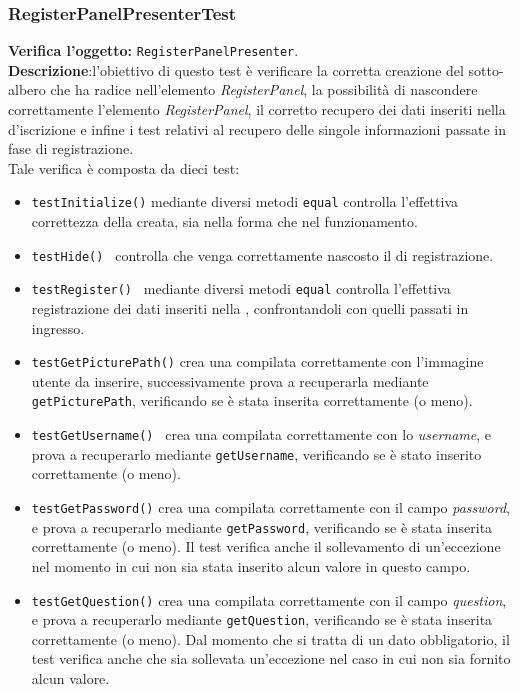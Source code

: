 \subsubsection{RegisterPanelPresenterTest}
\textbf{Verifica l'oggetto:} \texttt{RegisterPanelPresenter}.\\
\textbf{Descrizione}:l'obiettivo di questo test è verificare la corretta creazione del sotto-albero che ha radice nell'elemento \textit{RegisterPanel}, la possibilità di nascondere correttamente l'elemento \textit{RegisterPanel}, il corretto recupero dei dati inseriti nella  d'iscrizione e infine i test relativi al recupero delle singole informazioni passate in fase di registrazione.\\
Tale verifica è composta da dieci test:
\begin{itemize}
\item \texttt{testInitialize()} mediante diversi metodi \texttt{equal} controlla l'effettiva correttezza della  creata, sia nella forma che nel funzionamento.
\item \texttt{testHide() } controlla che venga correttamente nascosto il  di registrazione.
\item \texttt{testRegister() } mediante diversi metodi \texttt{equal} controlla l'effettiva registrazione dei dati inseriti nella , confrontandoli con quelli passati in ingresso.
\item \texttt{testGetPicturePath()} crea una  compilata correttamente con l'immagine utente da inserire, successivamente prova a recuperarla mediante \texttt{getPicturePath}, verificando se è stata inserita correttamente (o meno).
\item \texttt{testGetUsername() } crea una  compilata correttamente con lo \textit{username}, e prova a recuperarlo mediante \texttt{getUsername}, verificando se è stato inserito correttamente (o meno).
\item \texttt{testGetPassword()} crea una  compilata correttamente con il campo \textit{password}, e prova a recuperarlo mediante \texttt{getPassword}, verificando se è stata inserita correttamente (o meno). Il test verifica anche il sollevamento di un'eccezione nel momento in cui non sia stata inserito alcun valore in questo campo.
\item \texttt{testGetQuestion()}  crea una  compilata correttamente con il campo \textit{question}, e prova a recuperarlo mediante \texttt{getQuestion}, verificando se è stata inserita correttamente (o meno). Dal momento che si tratta di un dato obbligatorio, il test verifica anche che sia sollevata un'eccezione nel caso in cui non sia fornito alcun valore.

\end{itemize}
